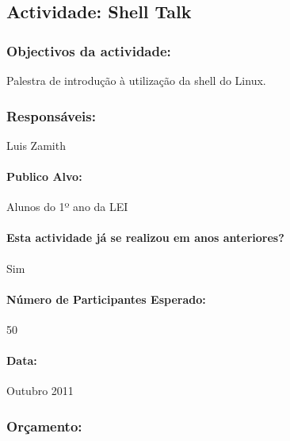 \subsection{Actividade: Shell Talk} %

\subsubsection*{Objectivos da actividade:}
Palestra de introdução à utilização da shell do Linux.

\subsubsection*{Responsáveis:}
\begin{itemizedash}
	\item{Luis Zamith}
\end{itemizedash}

\paragraph{Publico Alvo: }
Alunos do 1º ano da LEI

\paragraph{Esta actividade já se realizou em anos anteriores?}
Sim

\paragraph{Número de Participantes Esperado:}
50

\paragraph{Data:} Outubro 2011

\subsubsection*{Orçamento:}

